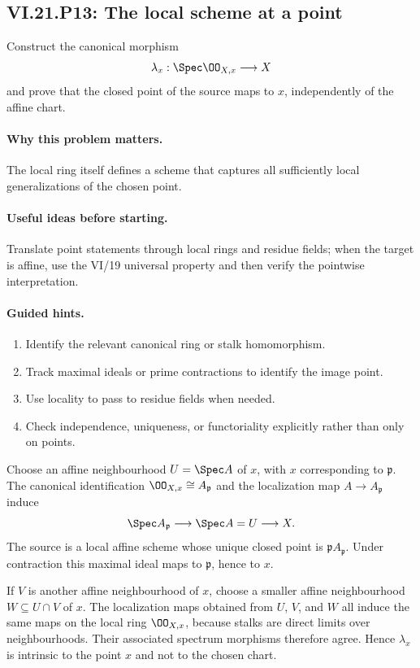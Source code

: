 \subsection*{VI.21.P13: The local scheme at a point}
\begin{problem}\label{prob:vi21-p13}
Construct the canonical morphism
\[
\lambda_x:\Spec\OO_{X,x}\longrightarrow X
\]
and prove that the closed point of the source maps to $x$, independently of the affine chart.
\end{problem}

\ifdefined\FullProblemDossiers
\paragraph{Why this problem matters.}
The local ring itself defines a scheme that captures all sufficiently local generalizations of the chosen point.

\paragraph{Useful ideas before starting.}
Translate point statements through local rings and residue fields; when the target is affine, use the VI/19 universal property and then verify the pointwise interpretation.

\paragraph{Guided hints.}
\begin{enumerate}
\item Identify the relevant canonical ring or stalk homomorphism.
\item Track maximal ideals or prime contractions to identify the image point.
\item Use locality to pass to residue fields when needed.
\item Check independence, uniqueness, or functoriality explicitly rather than only on points.
\end{enumerate}

\begin{solution}
Choose an affine neighbourhood $U=\Spec A$ of $x$, with $x$ corresponding to
$\mathfrak p$.  The canonical identification $\OO_{X,x}\cong A_{\mathfrak p}$ and the localization
map $A\to A_{\mathfrak p}$ induce
\[
\Spec A_{\mathfrak p}\longrightarrow\Spec A=U\longrightarrow X.
\]
The source is a local affine scheme whose unique closed point is
$\mathfrak pA_{\mathfrak p}$.  Under contraction this maximal ideal maps to
$\mathfrak p$, hence to $x$.

If $V$ is another affine neighbourhood of $x$, choose a smaller affine neighbourhood
$W\subseteq U\cap V$ of $x$.  The localization maps obtained from $U$, $V$, and $W$ all induce the
same maps on the local ring $\OO_{X,x}$, because stalks are direct limits over neighbourhoods.
Their associated spectrum morphisms therefore agree.  Hence $\lambda_x$ is intrinsic to the point
$x$ and not to the chosen chart.
\end{solution}

